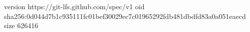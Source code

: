 version https://git-lfs.github.com/spec/v1
oid sha256:0d044d7b1c935111fc01bef30029ec7c01965292fdb481dbdfd83a0a051eaecd
size 626416
